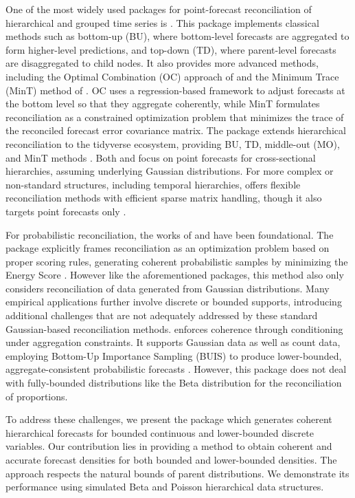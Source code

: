 One of the most widely used packages for point-forecast reconciliation of hierarchical and grouped time series is  \citep{htspackage}. This package implements classical methods such as bottom-up (BU), where bottom-level forecasts are aggregated to form higher-level predictions, and top-down (TD), where parent-level forecasts are disaggregated to child nodes. It also provides more advanced methods, including the Optimal Combination (OC) approach of \cite{Hyndman2011} and the Minimum Trace (MinT) method of \cite{Wickramasuriya2019}. OC uses a regression-based framework to adjust forecasts at the bottom level so that they aggregate coherently, while MinT formulates reconciliation as a constrained optimization problem that minimizes the trace of the reconciled forecast error covariance matrix. The  package extends hierarchical reconciliation to the tidyverse ecosystem, providing BU, TD, middle-out (MO), and MinT methods \citep{fabletools}. Both  and  focus on point forecasts for cross-sectional hierarchies, assuming underlying Gaussian distributions. For more complex or non-standard structures, including temporal hierarchies,  offers flexible reconciliation methods with efficient sparse matrix handling, though it also targets point forecasts only \citep{FoReco}.

For probabilistic reconciliation, the works of \cite{Taieb2017} and \cite{Panagiotelis2023} have been foundational. The  package explicitly frames reconciliation as an optimization problem based on proper scoring rules, generating coherent probabilistic samples by minimizing the Energy Score \citep{gneiting2007, Panagiotelis2023, ProbReco}. However like the aforementioned packages, this method also only considers reconciliation of data generated from Gaussian distributions. Many empirical applications further involve discrete or bounded supports, introducing additional challenges that are not adequately addressed by these standard Gaussian-based reconciliation methods.  enforces coherence through conditioning under aggregation constraints. It supports Gaussian data as well as count data, employing Bottom-Up Importance Sampling (BUIS) to produce lower-bounded, aggregate-consistent probabilistic forecasts \citep{Corani2023, bayesRecon}. However, this package does not deal with fully-bounded distributions like the Beta distribution for the reconciliation of proportions.

To address these challenges, we present the  package which generates coherent hierarchical forecasts for bounded continuous and lower-bounded discrete variables. Our contribution lies in providing a method to obtain coherent and accurate forecast densities for both bounded and lower-bounded densities. The approach respects the natural bounds of parent distributions. We demonstrate its performance using simulated Beta and Poisson hierarchical data structures.

